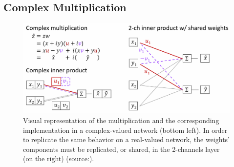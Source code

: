 \documentclass[../main.tex]{subfiles}
\begin{document}
 
\subsection*{Complex Multiplication}
\label{subsec:cmplx_multiplication}

\begin{figure}[!ht]
	\centering
	\includegraphics[width=\textwidth]{pictures/cmplx_multiplication.pdf}
	\caption{Visual representation of the multiplication and the corresponding implementation in a complex-valued network (bottom left). In order to replicate the same behavior on a real-valued network, the weights' components must be replicated, or shared, in the 2-channels layer (on the right) (source:\cite{Virtue:EECS-2019-126}).}
	\label{fig:cmplx_multiplication}
\end{figure}
\end{document}
